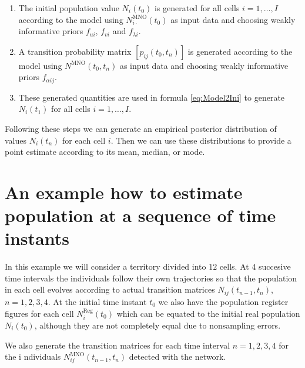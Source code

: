 \documentclass[12pt, a4paper]{article}
\begin{document}
\begin{enumerate}
	\item The initial population value $N_{i}(t_{0})$ is generated for all cells $i=1,\dots, I$ according to the 
	model using $N_{i\cdot}^{\textrm{MNO}}(t_{0})$ as input data and choosing weakly informative priors $f_{ui}$, $f_{vi}$ and $f_{\lambda i}$.
	\item A transition probability matrix $[p_{ij}(t_{0}, t_{n})]$ is generated according to the 
	model using $N^{\textrm{MNO}}(t_{0}, t_{n})$ as input data and choosing weakly informative priors $f_{\alpha ij}$.
	\item These generated quantities are used in formula \eqref{eq:Model2Ini} to generate $N_{i}(t_{1})$ for all cells $i=1,\dots,I$.
\end{enumerate}

Following these steps we can generate an empirical posterior distribution of values 
$N_{i}(t_{n})$ for each cell $i$. Then we can use these distributions to provide a point estimate 
according to its mean, median, or mode.


\section{An example how to estimate population at a sequence of time instants}

In this example we will consider a territory divided into $12$ cells. At $4$ succesive time intervals 
the individuals follow their own trajectories so that the population in each cell evolves according to 
actual transition matrices $N_{ij}(t_{n-1}, t_{n})$, $n=1,2,3,4$. At the initial time instant $t_{0}$ we 
also have the population register figures for each cell $N_{i}^{\textrm{Reg}}(t_{0})$ which can 
be equated to the initial real population $N_{i}(t_{0})$, although they are not completely 
equal due to nonsampling errors.

We also generate the transition matrices for each time interval $n=1,2,3,4$ for the i
ndividuals $N_{ij}^{\textrm{MNO}}(t_{n-1}, t_{n})$ detected with the network.
\end{document}
